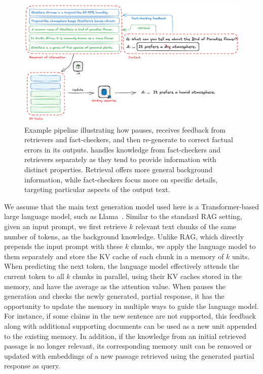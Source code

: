 \begin{figure}
    \centering
    \includegraphics[width=\textwidth]{figures/intro_fig.png}
    \caption{Example pipeline illustrating how \model pauses, receives feedback from retrievers and fact-checkers, and then re-generate to correct factual errors in its outputs. \model handles knowledge from fact-checkers and retrievers separately as they tend to provide information with distinct properties. Retrieval offers more general background information, while fact-checkers focus more on specific details, targeting particular aspects of the output text.}
    \label{fig:intro}
\end{figure}



We assume that the main text generation model used here is a Transformer-based large language model, such as Llama~\citep{dubey2024llama3herdmodels}. Similar to the standard RAG setting, given an input prompt, we first retrieve $k$ relevant text chunks of the same number of tokens, as the background knowledge. Unlike RAG, which directly prepends the input prompt with these $k$ chunks, we apply the language model to them separately and store the KV cache of each chunk in a memory of $k$ units. When predicting the next token, the language model effectively attends the current token to all $k$ chunks in parallel, using their KV caches stored in the memory, and have the average as the attention value. 
When \model pauses the generation and checks the newly generated, partial response, it has the opportunity to update the memory in multiple ways to guide the language model. For instance, if some claims in the new sentence are not supported, this feedback along with additional supporting documents can be used as a new unit appended to the existing memory. In addition, if the knowledge from an initial retrieved passage is no longer relevant, its corresponding memory unit can be removed or updated with embeddings of a new passage retrieved using the generated partial response as query. 

